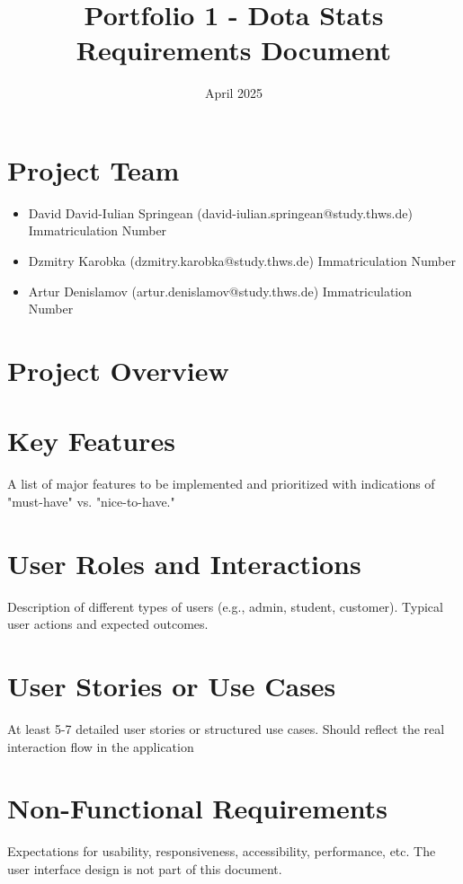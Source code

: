 \documentclass{article}
\title{Portfolio 1 - Dota Stats Requirements Document}
\date{April 2025}
\begin{document}
\maketitle

\section{Project Team}

\begin{itemize}
    \item David David-Iulian Springean (david-iulian.springean@study.thws.de) Immatriculation Number
    \item Dzmitry Karobka (dzmitry.karobka@study.thws.de) Immatriculation Number
    \item Artur Denislamov (artur.denislamov@study.thws.de) Immatriculation Number
\end{itemize}

\section{Project Overview}

\section{Key Features}
A list of major features to be implemented and prioritized with indications of "must-have" vs. "nice-to-have."

\section{User Roles and Interactions}
Description of different types of users (e.g., admin,
student, customer). Typical user actions and expected outcomes.

\section{User Stories or Use Cases}
At least 5-7 detailed user stories or structured use cases.
Should reflect the real interaction flow in the application

\section{Non-Functional Requirements}
Expectations for usability, responsiveness, accessibility, performance, etc. The user interface design is not part of this document.
\end{document}
